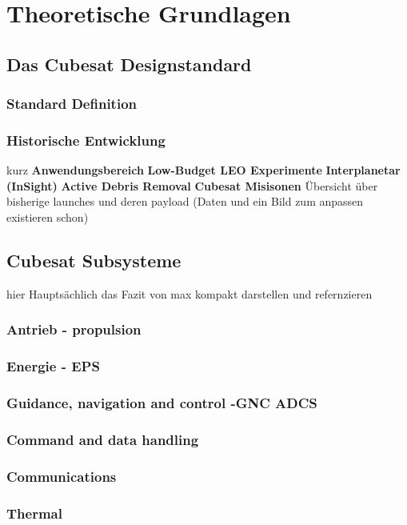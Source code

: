 \chapter{Theoretische Grundlagen}
\section{Das Cubesat Designstandard}
	\subsection{Standard Definition}
	\subsection{Historische Entwicklung} kurz
					\textbf{Anwendungsbereich}
					\textbf{Low-Budget LEO Experimente}
					\textbf{Interplanetar (InSight)}
					\textbf{Active Debris Removal}
					\textbf{Cubesat Misisonen}
					Übersicht über bisherige launches und deren payload (Daten und ein Bild zum anpassen existieren schon)
			
	\section{Cubesat Subsysteme}
	hier Hauptsächlich das Fazit von max kompakt darstellen und refernzieren
		\subsection{Antrieb - propulsion}
		\subsection{Energie - EPS}
		\subsection{Guidance, navigation and control -GNC ADCS}
		\subsection{Command and data handling}
		\subsection{Communications}
		\subsection{Thermal}

